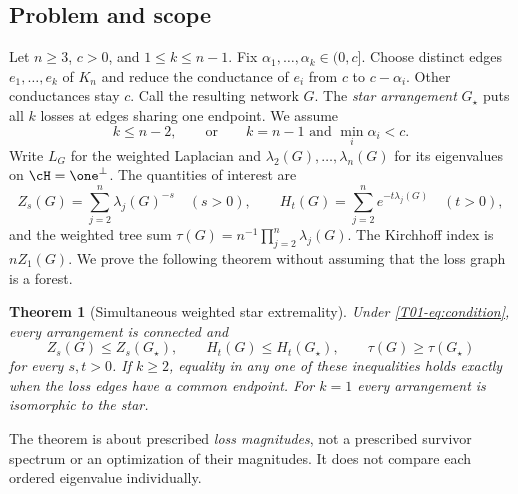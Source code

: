 \documentclass[11pt,a4paper]{article}
\newtheorem{theorem}{Theorem}[section]
\theoremstyle{definition}\newtheorem{definition}[theorem]{Definition}
\theoremstyle{remark}\newtheorem{remark}[theorem]{Remark}
\numberwithin{equation}{section}
\begin{document}
\subsection{Problem and scope}\label{T01-sec-1}
Let $n\ge3$, $c>0$, and $1\le k\le n-1$. Fix $\alpha_1,\ldots,\alpha_k\in(0,c]$. Choose distinct edges $e_1,\ldots,e_k$ of $K_n$ and reduce the conductance of $e_i$ from $c$ to $c-\alpha_i$. Other conductances stay $c$. Call the resulting network $G$. The \emph{star arrangement} $G_\star$ puts all $k$ losses at edges sharing one endpoint. We assume
\begin{equation}\label{T01-eq:condition}
 k\le n-2,\qquad\text{or}\qquad k=n-1\text{ and }\min_i\alpha_i<c.
\end{equation}
Write $L_G$ for the weighted Laplacian and $\lambda_2(G),\ldots,\lambda_n(G)$ for its eigenvalues on $\cH=\one^\perp$. The quantities of interest are
\[
 Z_s(G)=\sum_{j=2}^n\lambda_j(G)^{-s}\quad(s>0),\qquad
 H_t(G)=\sum_{j=2}^n e^{-t\lambda_j(G)}\quad(t>0),
\]
and the weighted tree sum $\tau(G)=n^{-1}\prod_{j=2}^n\lambda_j(G)$. The Kirchhoff index is $nZ_1(G)$. We prove the following theorem without assuming that the loss graph is a forest.
\begin{theorem}[Simultaneous weighted star extremality]\label{T01-thm:main}
Under \eqref{T01-eq:condition}, every arrangement is connected and
\[
 Z_s(G)\le Z_s(G_\star),\qquad H_t(G)\le H_t(G_\star),\qquad
 \tau(G)\ge\tau(G_\star)
\]
for every $s,t>0$. If $k\ge2$, equality in any one of these inequalities holds exactly when the loss edges have a common endpoint. For $k=1$ every arrangement is isomorphic to the star.
\end{theorem}
The theorem is about prescribed \emph{loss magnitudes}, not a prescribed survivor spectrum or an optimization of their magnitudes. It does not compare each ordered eigenvalue individually.
\end{document}
